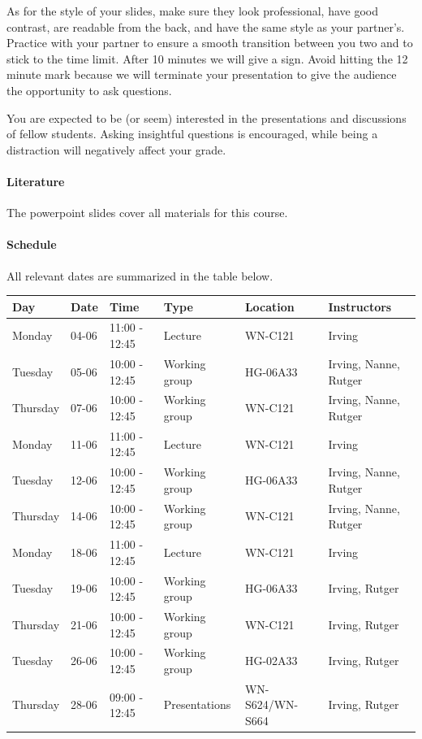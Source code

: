 \documentclass[a4paper]{report}
\begin{document}
As for the style of your slides, make sure they look professional, have good contrast, are readable from the back, and have the same style as your partner's. Practice with your partner to ensure a smooth transition between you two and to stick to the time limit. After 10 minutes we will give a sign. Avoid hitting the 12 minute mark because we will terminate your presentation to give the audience the opportunity to ask questions.

You are expected to be (or seem) interested in the presentations and discussions of fellow students. Asking insightful questions is encouraged, while being a distraction will negatively affect your grade.

\paragraph{Literature}
The powerpoint slides cover all materials for this course.

\paragraph{Schedule}
All relevant dates are summarized in the table below.

\begin{table}[h!]
	\begin{tabular}{| l | l | l | l | l | l |}
		\hline
		\textbf{Day}	&	\textbf{Date}	& \textbf{Time}	& \textbf{Type}			& \textbf{Location}	& \textbf{Instructors}	\\
		\hline
		Monday			&	04-06			& 11:00 - 12:45	& Lecture				& WN-C121			& Irving				\\
		Tuesday			&	05-06			& 10:00 - 12:45	& Working group			& HG-06A33			& Irving, Nanne, Rutger	\\
		Thursday		&	07-06			& 10:00 - 12:45	& Working group			& WN-C121			& Irving, Nanne, Rutger	\\
		\hline
		Monday			&	11-06			& 11:00 - 12:45	& Lecture				& WN-C121			& Irving				\\
		Tuesday			&	12-06			& 10:00 - 12:45	& Working group			& HG-06A33			& Irving, Nanne, Rutger	\\
		Thursday		&	14-06			& 10:00 - 12:45	& Working group			& WN-C121			& Irving, Nanne, Rutger	\\
		\hline
		Monday			&	18-06			& 11:00 - 12:45	& Lecture				& WN-C121			& Irving				\\
		Tuesday			&	19-06			& 10:00 - 12:45	& Working group			& HG-06A33			& Irving, Rutger	\\
		Thursday		&	21-06			& 10:00 - 12:45	& Working group			& WN-C121			& Irving, Rutger	\\
		\hline
		Tuesday			&	26-06			& 10:00 - 12:45	& Working group			& HG-02A33			& Irving, Rutger	\\
		Thursday		&	28-06			& 09:00 - 12:45	& Presentations			& WN-S624/WN-S664	& Irving, Rutger	\\
		\hline
	\end{tabular}
\end{table}
\end{document}
